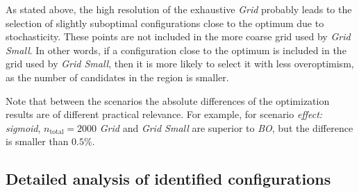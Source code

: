 \documentclass[bimj,fleqn]{w-art}
\theoremstyle{plain}
\theoremstyle{definition}
\begin{document}
As stated above, the high resolution of the exhaustive \emph{Grid} probably leads to the selection of slightly suboptimal configurations close to the optimum due to stochasticity.
These points are not included in the more coarse grid used by \emph{Grid Small}.
In other words, if a configuration close to the optimum is included in the grid used by \emph{Grid Small}, then it is more likely to select it with less overoptimism, as the number of candidates in the region is smaller.

Note that between the scenarios the absolute differences of the optimization results are of different practical relevance. For example, for scenario \emph{effect: sigmoid}, $n_{\text{total}} = 2000$ \emph{Grid} and \emph{Grid Small} are superior to \emph{BO}, but the difference is smaller than $0.5\%$.


\subsection{Detailed analysis of identified configurations}
\end{document}
